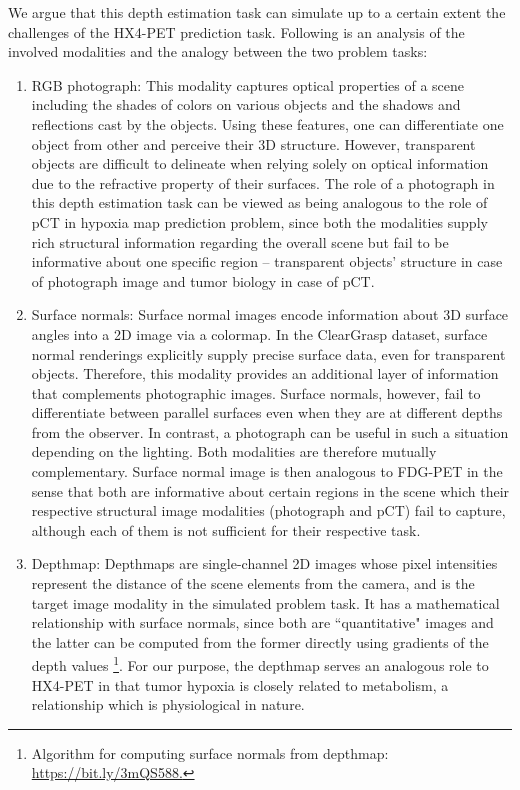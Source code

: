 We argue that this depth estimation task can simulate up to a certain extent the challenges of the HX4-PET prediction task. Following is an analysis of the involved modalities and the analogy between the two problem tasks:
 
\begin{enumerate}
    
    \item RGB photograph: This modality captures optical properties of a scene including the shades of colors on various objects and the shadows and reflections cast by the objects. Using these features, one can differentiate one object from other and perceive their 3D structure. However, transparent objects are difficult to delineate when relying solely on optical information due to the refractive property of their surfaces. The role of a photograph in this depth estimation task can be viewed as being analogous to the role of pCT in hypoxia map prediction problem, since both the modalities supply rich structural information regarding the overall scene but fail to be informative about one specific region -- transparent objects' structure in case of photograph image and tumor biology in case of pCT.
    
    \item Surface normals: Surface normal images encode information about 3D surface angles into a 2D image via a colormap. In the ClearGrasp dataset, surface normal renderings explicitly supply precise surface data, even for transparent objects. Therefore, this modality provides an additional layer of information that complements photographic images. Surface normals, however, fail to differentiate between parallel surfaces even when they are at different depths from the observer. In contrast, a photograph can be useful in such a situation depending on the lighting. Both modalities are therefore mutually complementary. Surface normal image is then analogous to FDG-PET in the sense that both are informative about certain regions in the scene which their respective structural image modalities (photograph and pCT) fail to capture, although each of them is not sufficient for their respective task. 
    
    \item Depthmap: Depthmaps are single-channel 2D images whose pixel intensities represent the distance of the scene elements from the camera, and is the target image modality in the simulated problem task. It has a mathematical relationship with surface normals, since both are ``quantitative" images and the latter can be computed from the former directly using gradients of the depth values \footnote{Algorithm for computing surface normals from depthmap: \url{https://bit.ly/3mQS588.}}. For our purpose, the depthmap serves an analogous role to HX4-PET in that tumor hypoxia is closely related to metabolism, a relationship which is physiological in nature.
    
\end{enumerate}


